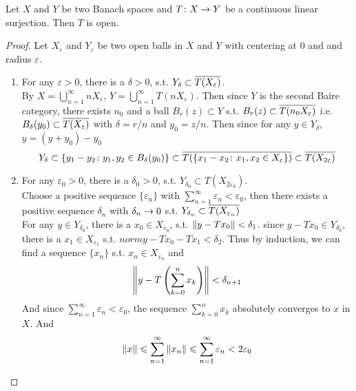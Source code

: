 \documentclass[a4paper,11pt]{report}
\begin{document}
\begin{thm}
	Let $X$ and $Y$ be two Banach spaces and $T \colon X \rightarrow Y$ be a continuous linear surjection. Then $T$ is open.
\end{thm}
\begin{proof}
	Let $X_\varepsilon$ and $Y_\varepsilon$ be two open balls in $X$ and $Y$ with centering at 0 and and radius $\varepsilon$.
	\begin{enumerate}[label=\arabic*)]
		\item For any $\varepsilon > 0$, there is a $\delta > 0$, s.t. $Y_{\delta} \subset \overline{T(X_{\varepsilon})}$. \\
		By $X = \bigcup_{n=1}^{\infty} n X_{\varepsilon}$, $Y=\bigcup_{n=1}^{\infty} T(nX_{\varepsilon})$. Then since $Y$ is the second Baire category, there exists $n_0$ and a ball $B_r(z) \subset Y$ s.t. $B_r(z) \subset \overline{T(n_0X_{\varepsilon})}$ i.e. $B_{\delta}(y_0) \subset \overline{T(X_{\varepsilon})}$ with $\delta = r/n$ and $y_0 = z/n$. Then since for any $y \in Y_{\delta}$, $y = (y+y_0) - y_0$
		\begin{equation*}
			Y_{\delta} \subset \{y_1-y_2 \colon y_1,y_2 \in B_{\delta}(y_0)\} \subset \overline{T(\{x_1-x_2 \colon x_1,x_2 \in X_{\varepsilon}\})} \subset \overline{T(X_{2\varepsilon})}
		\end{equation*}
		\item For any $\varepsilon_0 > 0$, there is a $\delta_0 > 0$, s.t. $Y_{\delta_0} \subset T(X_{2\varepsilon_0})$. \\
		Choose a positive sequence $\{\varepsilon_n\}$ with $\sum_{n=1}^{\infty} \varepsilon_n < \varepsilon_0$, then there exists a positive sequence $\delta_n$ with $\delta_n \rightarrow 0$ s.t. $Y_{\delta_n} \subset \overline{T(X_{\varepsilon_n})}$\\
		For any $y \in Y_{\delta_0}$, there is a $x_0 \in X_{\varepsilon_0}$, s.t. $\left\lVert y-Tx_0\right\lVert < \delta_1$. since $y-Tx_0 \in Y_{\delta_0}$, there is a $x_1 \in X_{\varepsilon_1}$ s.t. $norm{y-Tx_0-Tx_1} < \delta_2$. Thus by induction, we can find a sequence $\{x_n\}$ s.t. $x_n \in X_{\varepsilon_n}$ and
		\begin{equation*}
			 \left\lVert y-T\left(\sum_{k=0}^{n}x_k\right)\right\lVert < \delta_{n+1}
		\end{equation*}
		And since $\sum_{n=1}^{\infty} \varepsilon_n < \varepsilon_0$, the sequence $\sum_{k=0}^{n}x_k$ absolutely converges to $x$ in $X$. And
		\begin{equation*}
			\norm{x} \leqslant \sum_{n=1}^{\infty} \norm{x_n} \leqslant \sum_{n=1}^{\infty} \varepsilon_n < 2 \varepsilon_0

\end{equation*}
\end{enumerate}
\end{proof}
\end{document}
